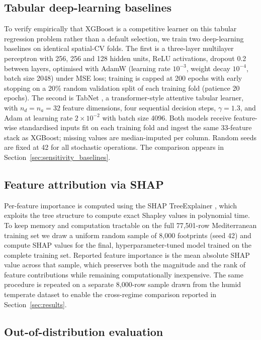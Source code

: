 \documentclass[preprint,authoryear,number]{elsarticle}
\begin{document}
\subsection{Tabular deep-learning baselines}
\label{sec:dl_baselines}

To verify empirically that XGBoost is a competitive learner on this tabular regression problem rather than a default selection, we train two deep-learning baselines on identical spatial-CV folds. The first is a three-layer multilayer perceptron with 256, 256 and 128 hidden units, ReLU activations, dropout 0.2 between layers, optimised with AdamW (learning rate $10^{-3}$, weight decay $10^{-4}$, batch size 2048) under MSE loss; training is capped at 200 epochs with early stopping on a 20\% random validation split of each training fold (patience 20 epochs). The second is TabNet \citep{Arik2021TabNet}, a transformer-style attentive tabular learner, with $n_d = n_a = 32$ feature dimensions, four sequential decision steps, $\gamma = 1.3$, and Adam at learning rate $2 \times 10^{-2}$ with batch size 4096. Both models receive feature-wise standardised inputs fit on each training fold and ingest the same 33-feature stack as XGBoost; missing values are median-imputed per column. Random seeds are fixed at 42 for all stochastic operations. The comparison appears in Section~\ref{sec:sensitivity_baselines}.

\subsection{Feature attribution via SHAP}
\label{sec:shap}

Per-feature importance is computed using the SHAP TreeExplainer \citep{Lundberg2017SHAP}, which exploits the tree structure to compute exact Shapley values in polynomial time. To keep memory and computation tractable on the full 77{,}501-row Mediterranean training set we draw a uniform random sample of 8{,}000 footprints (seed 42) and compute SHAP values for the final, hyperparameter-tuned model trained on the complete training set. Reported feature importance is the mean absolute SHAP value across that sample, which preserves both the magnitude and the rank of feature contributions while remaining computationally inexpensive. The same procedure is repeated on a separate 8{,}000-row sample drawn from the humid temperate dataset to enable the cross-regime comparison reported in Section~\ref{sec:results}.

\subsection{Out-of-distribution evaluation}
\label{sec:ood_method}
\end{document}
